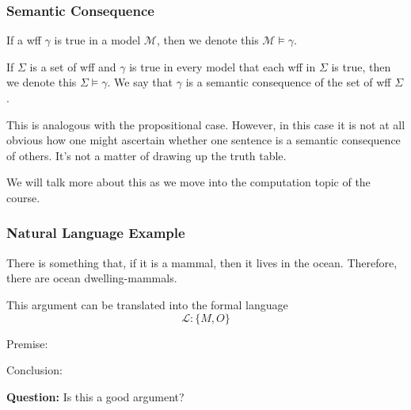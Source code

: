 \documentclass{beamer}
\theoremstyle{indentDefn} \newtheorem{defn}[]{Definition}
\begin{document}
\begin{frame}
	\frametitle{Semantic Consequence}
	
	If a wff $\gamma$ is true in a model $\mathcal{M}$, then we denote this $\mathcal M \vDash \gamma$.
	
	\vspace{0.5cm}
	
	If $\Sigma$ is a set of wff and $\gamma$ is true in every model that each wff in $\Sigma$ is true, then we denote this $\Sigma \vDash \gamma$. We say that $\gamma$ is a semantic consequence of the set of wff $\Sigma$.
	
	\vspace{0.5cm}
	
	This is analogous with the propositional case. However, in this case it is not at all obvious how one might ascertain whether one sentence is a semantic consequence of others. It's not a matter of drawing up the truth table. 
	
	\vspace{0.5cm}
	
	We will talk more about this as we move into the computation topic of the course. 
	
\end{frame}

\begin{frame}
	\frametitle{Natural Language Example}
	
	There is something that, if it is a mammal, then it lives in the ocean. Therefore, there are ocean dwelling-mammals. 
	
	\vspace{0.5cm}
	
	This argument can be translated into the formal language $$\mathcal{L}:\{M,O\}$$
	
	\vspace{0.3cm}
	
	Premise:
	
	\vspace{0.5cm}
	
	Conclusion: 
	
	\vspace{0.5cm}
	
	{\bf Question:} Is this a good argument? 
	
\end{frame}
\end{document}
